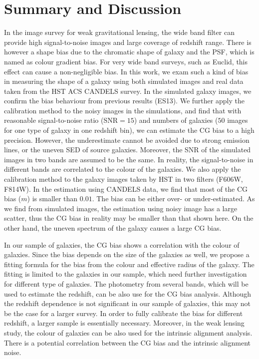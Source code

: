 \documentclass[useAMS,usenatbib]{mn2e}
\begin{document}
\section{Summary and Discussion}
In the image survey for weak gravitational lensing, the wide band
filter can provide high signal-to-noise images and large coverage of
redshift range. There is however a shape bias due to the chromatic
shape of galaxy and the PSF, which is named as colour gradient
bias. For very wide band surveys, such as Euclid, this effect can
cause a non-negligible bias.
%
In this work, we exam such a kind of bias in measuring the shape of
a galaxy using both simulated images and real data taken from the HST ACS
CANDELS survey.  In the simulated galaxy images, we confirm the bias
behaviour from previous results (ES13). We further apply the calibration
method to the noisy images in the simulations, and find that with
reasonable signal-to-noise ratio (SNR$=15$) and numbers of galaxies ($50$
images for one type of galaxy in one redshift bin), we can estimate
the CG bias to a high precision. However, the underestimate cannot
be avoided due to strong emission lines, or the uneven SED of source
galaxies. Moreover, the SNR of the simulated images in two
bands are assumed to be the same. In reality, the signal-to-noise in
different bands are correlated to the colour of the galaxies.
%
We also apply the calibration method to the galaxy images taken by HST
in two filters (F606W, F814W). In the estimation using CANDELS data,
we find that most of the CG bias ($m$) is smaller than $0.01$. The
bias can be either over- or under-estimated. As we find from simulated
images, the estimation using noisy image has a large scatter, thus the
CG bias in reality may be smaller than that shown here. On the other
hand, the uneven spectrum of the galaxy causes a large CG bias.

In our sample of galaxies, the CG bias shows a correlation with the
colour of galaxies. Since the bias depends on the size of the galaxies
as well, we propose a fitting formula for the bias from the colour and
effective radius of the galaxy. The fitting is limited to the galaxies
in our sample, which need further investigation for different type of
galaxies.  The photometry from several bands, which will be used to
estimate the redshift, can be also use for the CG bias
analysis. Although the redshift dependence is not significant in our
sample of galaxies, this may not be the case for a larger
survey. In order to fully calibrate the bias for different redshift, a
larger sample is essentially necessary. Moreover, in the weak lensing
study, the colour of galaxies can be also used for the intrinsic
alignment analysis. There is a potential correlation between the CG
bias and the intrinsic alignment noise.
\end{document}
